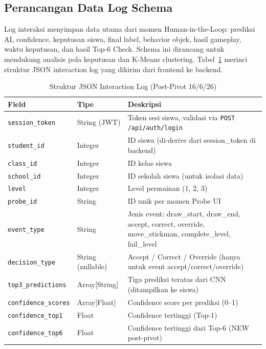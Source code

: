 \documentclass[12pt,a4paper,oneside,openany]{report}
\begin{document}
\subsection{Perancangan Data Log Schema}
\label{subsec:data-log-schema}

Log interaksi menyimpan data utama dari momen Human-in-the-Loop: prediksi AI, confidence, keputusan siswa, final label, behavior objek, hasil gameplay, waktu keputusan, dan hasil Top-6 Check. Schema ini dirancang untuk mendukung analisis pola keputusan dan K-Means clustering. Tabel~\ref{tab:json-log} merinci struktur JSON interaction log yang dikirim dari frontend ke backend.

\begin{table}[H]
\centering
\caption{Struktur JSON Interaction Log (Post-Pivot 16/6/26)}
\label{tab:json-log}
\begin{tabular}{|p{3.5cm}|p{2.5cm}|p{7cm}|}
\hline
\textbf{Field} & \textbf{Tipe} & \textbf{Deskripsi} \\ \hline
\texttt{session\_token} & String (JWT) & Token sesi siswa, validasi via \texttt{POST /api/auth/login} \\ \hline
\texttt{student\_id} & Integer & ID siswa (di-derive dari session\_token di backend) \\ \hline
\texttt{class\_id} & Integer & ID kelas siswa \\ \hline
\texttt{school\_id} & Integer & ID sekolah siswa (untuk isolasi data) \\ \hline
\texttt{level} & Integer & Level permainan (1, 2, 3) \\ \hline
\texttt{probe\_id} & String & ID unik per momen Probe UI \\ \hline
\texttt{event\_type} & String & Jenis event: draw\_start, draw\_end, accept, correct, override, move\_stickman, complete\_level, fail\_level \\ \hline
\texttt{decision\_type} & String (nullable) & Accept / Correct / Override (hanya untuk event accept/correct/override) \\ \hline
\texttt{top3\_predictions} & Array[String] & Tiga prediksi teratas dari CNN (ditampilkan ke siswa) \\ \hline
\texttt{confidence\_scores} & Array[Float] & Confidence score per prediksi (0--1) \\ \hline
\texttt{confidence\_top1} & Float & Confidence tertinggi (Top-1) \\ \hline
\texttt{confidence\_top6} & Float & Confidence tertinggi dari Top-6 (NEW post-pivot) \\ \hline

\end{tabular}
\end{table}
\end{document}
